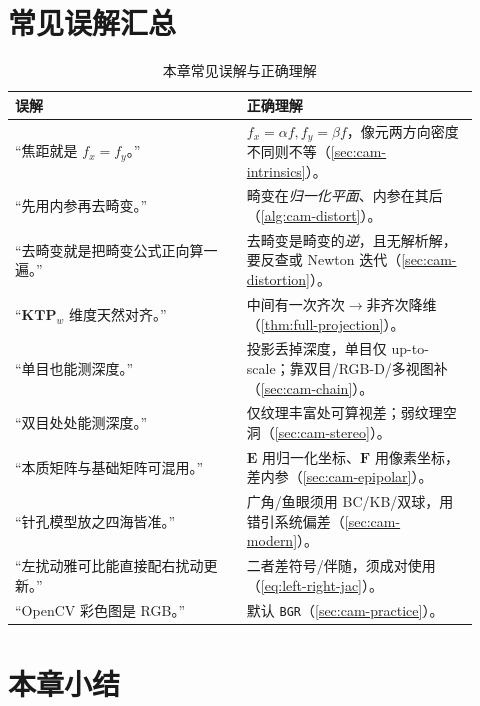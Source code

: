 \section*{常见误解汇总}
\begin{table}[H]\centering\small
\caption{本章常见误解与正确理解}
\begin{tabular}{p{0.46\linewidth}p{0.46\linewidth}}
\toprule
误解 & 正确理解 \\
\midrule
“焦距就是 $f_x=f_y$。” & $f_x=\alpha f,f_y=\beta f$，像元两方向密度不同则不等（\cref{sec:cam-intrinsics}）。 \\
“先用内参再去畸变。” & 畸变在\emph{归一化平面}、内参在其后（\cref{alg:cam-distort}）。 \\
“去畸变就是把畸变公式正向算一遍。” & 去畸变是畸变的\emph{逆}，且无解析解，要反查或 Newton 迭代（\cref{sec:cam-distortion}）。 \\
“$\mathbf{K}\mathbf{T}\mathbf{P}_w$ 维度天然对齐。” & 中间有一次齐次$\to$非齐次降维（\cref{thm:full-projection}）。 \\
“单目也能测深度。” & 投影丢掉深度，单目仅 up-to-scale；靠双目/RGB-D/多视图补（\cref{sec:cam-chain}）。 \\
“双目处处能测深度。” & 仅纹理丰富处可算视差；弱纹理空洞（\cref{sec:cam-stereo}）。 \\
“本质矩阵与基础矩阵可混用。” & $\mathbf{E}$ 用归一化坐标、$\mathbf{F}$ 用像素坐标，差内参（\cref{sec:cam-epipolar}）。 \\
“针孔模型放之四海皆准。” & 广角/鱼眼须用 BC/KB/双球，用错引系统偏差（\cref{sec:cam-modern}）。 \\
“左扰动雅可比能直接配右扰动更新。” & 二者差符号/伴随，须成对使用（\cref{eq:left-right-jac}）。 \\
“OpenCV 彩色图是 RGB。” & 默认 \texttt{BGR}（\cref{sec:cam-practice}）。 \\
\bottomrule
\end{tabular}
\end{table}

\section*{本章小结}

